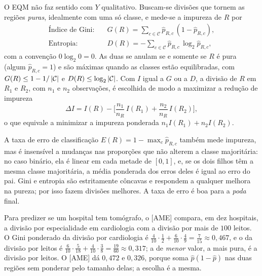 \documentclass[11pt,a4paper]{article}
\begin{document}
\noindent O EQM não faz sentido com $Y$ qualitativo. Buscam-se divisões que tornem as
regiões \emph{puras}, idealmente com uma só classe, e mede-se a impureza de $R$ por
\begin{align}
  \text{Índice de Gini:}\quad & G(R) = \sum_{c\in\mathcal{C}} \widehat p_{R,c}\,(1-\widehat p_{R,c}),
  \label{eq:gini}\\
  \text{Entropia:}\quad & D(R) = -\sum_{c\in\mathcal{C}} \widehat p_{R,c}\,\log_2 \widehat p_{R,c},
  \label{eq:entropia}
\end{align}
com a convenção $0\log_2 0=0$. As duas se anulam se e somente se $R$ é pura (algum
$\widehat p_{R,c}=1$) e são máximas quando as classes estão equilibradas, com
$G(R)\le1-1/\left\lvert \mathcal{C} \right\rvert$ e $D(R)\le\log_2\left\lvert \mathcal{C} \right\rvert$. Com $I$ igual a $G$
ou a $D$, a divisão de $R$ em $R_1$ e $R_2$, com $n_1$ e $n_2$ observações, é escolhida
de modo a maximizar a redução de impureza
\[
  \Delta I = I(R)-\Big[\frac{n_1}{n_R}\,I(R_1)+\frac{n_2}{n_R}\,I(R_2)\Big],
\]
o que equivale a minimizar a impureza ponderada $n_1I(R_1)+n_2I(R_2)$.

\begin{observacao}
A taxa de erro de classificação $E(R)=1-\max_c \widehat p_{R,c}$ também mede
impureza, mas é insensível a mudanças nas proporções que não alterem a classe
majoritária: no caso binário, ela é linear em cada metade de $[0,1]$, e, se os dois
filhos têm a mesma classe majoritária, a média ponderada dos erros deles é igual ao
erro do pai. Gini e entropia são estritamente côncavas e respondem a qualquer melhora
na pureza; por isso fazem divisões melhores. A taxa de erro é boa para a \emph{poda}
final.
\end{observacao}

\begin{exemplo}
Para predizer se um hospital tem tomógrafo, o [AME] compara, em dez hospitais, a
divisão por especialidade em cardiologia com a divisão por mais de $100$ leitos. O
Gini ponderado da divisão por cardiologia é
$\frac4{10}\cdot\frac12+\frac6{10}\cdot\frac49=\frac7{15}\approx0{,}467$, e o da
divisão por leitos é
$\frac6{10}\cdot\frac5{18}+\frac4{10}\cdot\frac38=\frac{19}{60}\approx0{,}317$; a de
\emph{menor} valor, a mais pura, é a divisão por leitos. O [AME] dá $0{,}472$ e
$0{,}326$, porque soma $\widehat p(1-\widehat p)$ nas duas regiões sem ponderar pelo
tamanho delas; a escolha é a mesma.
\end{exemplo}
\end{document}
